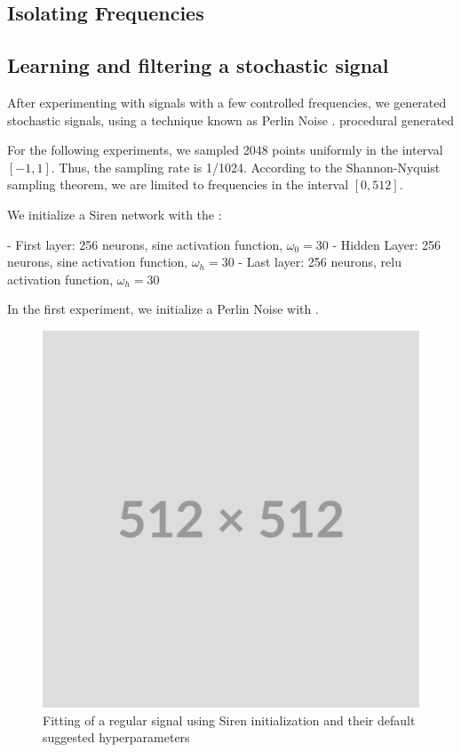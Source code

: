 \subsection{Isolating Frequencies}




\subsection{Learning and filtering a stochastic signal}

After experimenting with signals with a few controlled frequencies, we generated stochastic signals, using a technique known as Perlin Noise \cite{perlin-1985}. procedural generated


For the following experiments, we sampled 2048 points uniformly in the interval $[-1, 1]$. Thus, the sampling rate is 1/1024. According to the Shannon-Nyquist sampling theorem, we are limited to frequencies in the interval $[0, 512]$. 

We initialize a Siren network with the :

- First layer: 256 neurons, sine activation function, $\omega_0=30$
- Hidden Layer: 256 neurons, sine activation function, $\omega_h=30$
- Last layer: 256 neurons, relu activation function, $\omega_h=30$


In the first experiment, we initialize a Perlin Noise with . 

\begin{figure}
    \includegraphics[width=0.3\linewidth]{img/placeholder512.png}
    \caption{Fitting of a regular signal using Siren initialization and their default suggested hyperparameters}
\end{figure}



